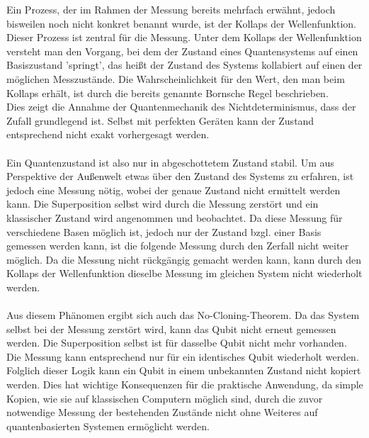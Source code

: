 Ein Prozess, der im Rahmen der Messung bereits mehrfach erwähnt, jedoch bisweilen noch nicht konkret benannt wurde, ist der Kollaps der Wellenfunktion. Dieser Prozess ist zentral für die Messung. 
Unter dem Kollaps der Wellenfunktion versteht man den Vorgang, bei dem der Zustand eines Quantensystems auf einen Basiszustand 'springt', das heißt der Zustand des Systems kollabiert auf einen der möglichen Messzustände. Die Wahrscheinlichkeit für den Wert, den man beim Kollaps erhält, ist durch die bereits genannte Bornsche Regel beschrieben. \\
Dies zeigt die Annahme der Quantenmechanik des Nichtdeterminismus, dass der Zufall grundlegend ist. Selbst mit perfekten Geräten kann der Zustand entsprechend nicht exakt vorhergesagt werden. 
\cite{lvovsky_quantum_2018}
\\
\\
Ein Quantenzustand ist also nur in abgeschottetem Zustand stabil. Um aus Perspektive der Außenwelt etwas über den Zustand des Systems zu erfahren, ist jedoch eine Messung nötig, wobei der genaue Zustand nicht ermittelt werden kann.
Die Superposition selbst wird durch die Messung zerstört und ein klassischer Zustand wird angenommen und beobachtet. Da diese Messung für verschiedene Basen möglich ist, jedoch nur der Zustand bzgl. einer Basis gemessen werden kann, ist die folgende Messung durch den Zerfall nicht weiter möglich.
Da die Messung nicht rückgängig gemacht werden kann, kann durch den Kollaps der Wellenfunktion dieselbe Messung im gleichen System nicht wiederholt werden.
\cite{homeister_quantum_2022}
\\
\\
Aus diesem Phänomen ergibt sich auch das No-Cloning-Theorem. Da das System selbst bei der Messung zerstört wird, kann das Qubit nicht erneut gemessen werden. Die Superposition selbst ist für dasselbe Qubit nicht mehr vorhanden. Die Messung kann entsprechend nur für ein identisches Qubit wiederholt werden.
Folglich dieser Logik kann ein Qubit in einem unbekannten Zustand nicht kopiert werden. Dies hat wichtige Konsequenzen für die praktische Anwendung, da simple Kopien, wie sie auf klassischen Computern möglich sind, durch die zuvor notwendige Messung der bestehenden Zustände nicht ohne Weiteres auf quantenbasierten Systemen ermöglicht werden.
\cite{hughes_quantum_2021}

